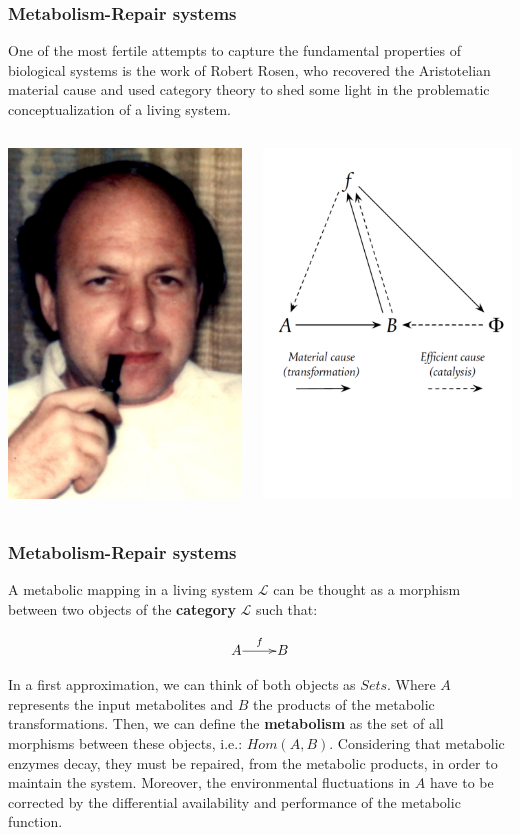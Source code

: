\begin{frame}

\frametitle{Metabolism-Repair systems}

One of the most fertile attempts to capture the fundamental properties of biological systems is the work of Robert Rosen, who recovered the Aristotelian material cause and used category theory to shed some light in the problematic conceptualization of a living system.
 \begin{columns}
    \begin{column}{0.5\textwidth}
      \centering
		\includegraphics[width=3 cm]{fig/rosen.jpg}
    \end{column}
    \begin{column}{0.5\textwidth}
      \centering
	      \includegraphics[width=4 cm]{fig/rosen_diagram.pdf}
    \end{column}
\end{columns}

\end{frame}

\begin{frame}

\frametitle{Metabolism-Repair systems}

A metabolic mapping in a living system $\mathcal{L}$ can be thought as a morphism between two objects of the \textbf{category} $\mathcal{L}$ such that:

$$
	\xymatrix@1{
	A\ar[r]^f &B}
	$$

In a first approximation, we can think of both objects as $Sets$. Where $A$ represents the input metabolites and $B$  the products of the metabolic transformations. Then, we can define the \textbf{metabolism} as the set of all morphisms between these objects, i.e.: $Hom(A,B)$. Considering that metabolic enzymes decay, they must be repaired, from the metabolic products, in order to maintain the system. Moreover, the environmental fluctuations in $A$ have to be corrected by the differential availability and performance of the metabolic function.
	
\end{frame}


